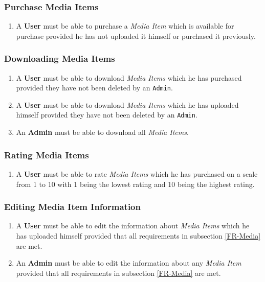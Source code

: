 \documentclass[../report.tex]{subfiles}
\begin{document}
\subsubsection {Purchase Media Items}

\begin{enumerate}[label=\textbf{FR-\twodigits*}, resume]
	\item A \textbf{User} must be able to purchase a \textit{Media Item} which is available for purchase provided he has not uploaded it himself or  purchased it previously.
\end{enumerate}

\subsubsection {Downloading Media Items}

\begin{enumerate}[label=\textbf{FR-\twodigits*}, resume]
	\item A \textbf{User} must be able to download \textit{Media Items} which he has purchased provided they have not been deleted by an \texttt{Admin}.
	\item A \textbf{User} must be able to download \textit{Media Items} which he has uploaded himself provided they have not been deleted by an \texttt{Admin}.
	\item An \textbf{Admin} must be able to download all \textit{Media Items}.
\end{enumerate}
		
\subsubsection {Rating Media Items} \label{FR-RatingMedia}

\begin{enumerate}[label=\textbf{FR-\twodigits*}, resume]
	\item A \textbf{User} must be able to rate \textit{Media Items} which he has purchased on a scale from 1 to 10 with 1 being the lowest rating and 10 being the highest rating.
\end{enumerate}

\subsubsection{Editing Media Item Information}

\begin{enumerate}[label=\textbf{FR-\twodigits*}, resume]
	\item A \textbf{User} must be able to edit the information about \textit{Media Items} which he has uploaded himself provided that all requirements in subsection \ref{FR-Media} are met.
	\item An \textbf{Admin} must be able to edit the information about any \textit{Media Item} provided that all requirements in subsection \ref{FR-Media} are met.
\end{enumerate}
			
\end{document}
